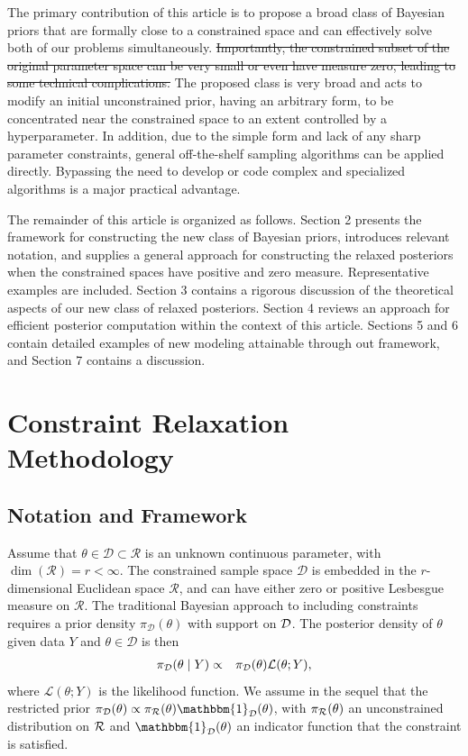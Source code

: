 \documentclass[10pt,fleqn]{article}
\DeclareMathOperator{\1}{\mathbbm{1}} \DeclareMathOperator{\bigO}{\mc O}
\begin{document}
The primary contribution of this article is to propose a broad class of Bayesian priors that are formally close to a constrained space and can effectively solve both of our problems simultaneously.  \sout{Importantly, the constrained subset of the original parameter space can be very small or even have measure
zero, leading to some technical complications.} The proposed class is very broad and 
acts to modify an initial unconstrained prior, having an arbitrary form, to be concentrated near
the constrained space to an extent controlled by a hyperparameter.  In addition, due to the simple form and lack of any sharp parameter constraints, general off-the-shelf sampling algorithms can be applied directly.  
Bypassing the need to develop or code complex and specialized algorithms is a major practical advantage.

The remainder of this article is organized as follows. Section 2 presents the framework for constructing the new class of Bayesian priors, introduces relevant notation, and supplies a general approach for constructing the relaxed posteriors when the constrained spaces have positive and zero measure. Representative examples are included.  Section 3 contains a rigorous discussion of the theoretical aspects of our new class of relaxed posteriors.  Section 4 reviews an approach for efficient posterior computation within the context of this article.  Sections 5 and 6 contain detailed examples of new modeling attainable through out framework, and Section 7 contains a discussion.



\section{Constraint Relaxation Methodology}

\subsection{Notation and Framework}

Assume that $\theta \in \mathcal{D} \subset \mathcal{R}$ is an unknown continuous parameter, 
with $\dim(\mathcal{R})=r < \infty$.  The constrained sample space $\mathcal{D}$ is 
embedded in the $r$-dimensional Euclidean space $\mathcal{R}$, and can have 
either zero or positive Lesbesgue measure on $\mathcal{R}$.  The traditional Bayesian approach to including constraints requires a prior density $\pi_\mathcal{D}(\theta)$ with support on $\mathcal{D}$. The posterior density of $\theta$
given data $Y$ and $\theta \in \mathcal{D}$ is then
\begin{eqnarray}
\pi_{\mc D}(\theta \mid  Y) %
& \propto & \pi_\mathcal{D}(\theta)\mathcal{L}(\theta; Y), \label{eq:sharp}
\end{eqnarray}
where $\mathcal{L}(\theta; Y)$ is the likelihood function. We assume in the sequel that the restricted prior $\pi_\mathcal{D}(\theta) \propto \pi_{\mc R}(\theta)\mathbbm{1}_{\mc D}(\theta)$, with $\pi_{\mathcal{R}}(\theta)$ an unconstrained distribution on ${\mathcal{R}}$ and $\mathbbm{1}_{\mc D}(\theta)$ an indicator
function that the constraint is satisfied.
\end{document}
